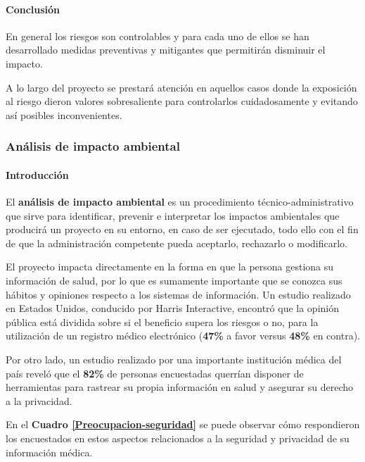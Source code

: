 \paragraph{Conclusión}

En general los riesgos son controlables y para cada uno de ellos se han desarrollado medidas preventivas y mitigantes que permitirán  disminuir el impacto. 

A lo largo del proyecto se prestará atención en aquellos casos donde la exposición al riesgo dieron valores sobresaliente para controlarlos cuidadosamente y evitando así posibles inconvenientes.


\subsubsection{Análisis de impacto ambiental}


\paragraph{Introducción}
	El \textbf{análisis de impacto ambiental} es un procedimiento técnico-administrativo que sirve para identificar, prevenir e interpretar los impactos ambientales que producirá un proyecto en su entorno, en caso de ser ejecutado, todo ello con el fin de que la administración competente pueda aceptarlo, rechazarlo o modificarlo.
    
    El proyecto impacta directamente en la forma en que la persona gestiona su información de salud, por lo que es sumamente importante que se conozca sus hábitos y opiniones respecto a los sistemas de información.
    Un estudio realizado en Estados Unidos, conducido por Harris Interactive, encontró que la opinión pública está dividida sobre si el beneficio supera los riesgos o no, para la utilización de un registro médico electrónico (\textbf{47\%} a favor versus \textbf{48\%} en contra).
    
    Por otro lado, un estudio realizado por una importante institución médica del país reveló que el \textbf{82\%} de personas encuestadas querrían disponer de herramientas para rastrear su propia información en salud y asegurar su derecho a la privacidad.
    
    En el \textbf{Cuadro \ref{Preocupacion-seguridad}} se puede observar cómo respondieron los encuestados en estos aspectos relacionados a la seguridad y privacidad de su información médica.
    
